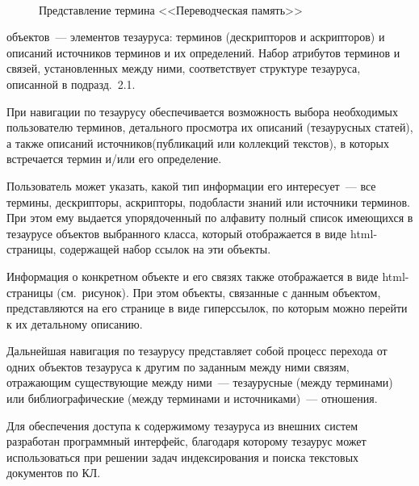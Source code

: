 \begin{figure}
 \vspace*{1pt}
 \begin{center}
 \mbox{%
 \epsfxsize=160mm
 }
 \end{center}
 \vspace*{3pt}
\begin{center}
{\small Представление термина <<Переводческая память>>}
\end{center}
\vspace*{6pt}
  \end{figure}


\begin{multicols}{2}

\noindent
 объектов~--- элементов тезауруса: терминов 
(дескрипторов и аскрипторов) и описаний источников терминов и их определений. Набор 
атрибутов терминов и связей, установленных между ними, соответствует структуре 
тезауруса, описанной в подразд.~2.1.
  
  При навигации по тезаурусу обеспечивается возможность выбора необходимых 
пользователю терминов, детального просмотра их описаний (тезаурусных статей), а также 
описаний источников\linebreak (публикаций или коллекций текстов), в которых встречается термин 
и/или его определение.
  
  Пользователь может указать, какой тип информации его интересует~--- все термины, 
дескрипторы, аскрипторы, подобласти знаний или источники терминов. При этом ему 
выдается упорядоченный по алфавиту полный список имеющихся в тезаурусе объектов 
выбранного класса, который отображается в виде html-страницы, содержащей набор ссылок 
на эти объекты. 
  
  Информация о конкретном объекте и его связях также отображается в виде html-страницы 
(см.\ рисунок). При этом объекты, связанные с данным объектом, представляются на его 
странице в виде гиперссылок, по которым можно перейти к их детальному описанию.
  
  Дальнейшая навигация по тезаурусу представляет собой процесс перехода от одних 
объектов тезауруса к другим по заданным между ними связям, отражающим существующие 
между ними~--- тезаурусные (между терминами) или библиографические (между терминами 
и источниками)~--- отношения.


   
  Для обеспечения доступа к содержимому тезауруса из внешних систем разработан 
программный интерфейс, благодаря которому тезаурус может использоваться при решении 
задач индексирования и поиска текстовых документов по КЛ.
  

\end{multicols}
